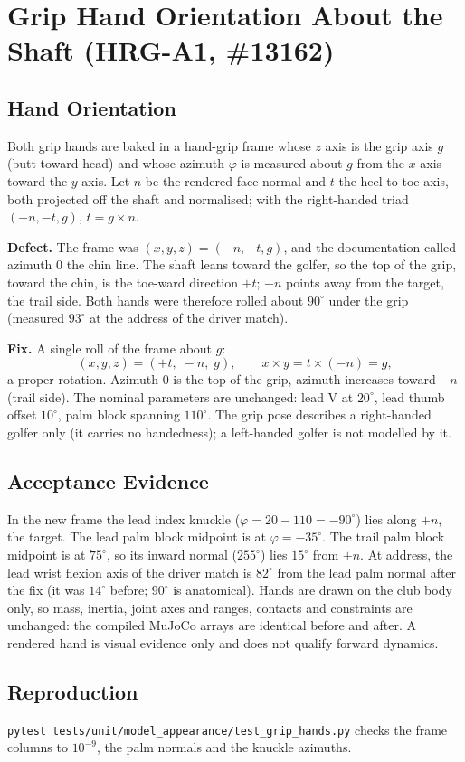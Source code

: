 \section{Grip Hand Orientation About the Shaft (HRG-A1, \#13162)}

\subsection{Hand Orientation}
Both grip hands are baked in a hand-grip frame whose $z$ axis is the grip axis
$g$ (butt toward head) and whose azimuth $\varphi$ is measured about $g$ from
the $x$ axis toward the $y$ axis. Let $n$ be the rendered face normal and $t$
the heel-to-toe axis, both projected off the shaft and normalised; with the
right-handed triad $(-n, -t, g)$, $t = g \times n$.

\textbf{Defect.} The frame was $(x, y, z) = (-n, -t, g)$, and the documentation
called azimuth 0 the chin line. The shaft leans toward the golfer, so the top of
the grip, toward the chin, is the toe-ward direction $+t$; $-n$ points away from
the target, the trail side. Both hands were therefore rolled about $90^{\circ}$
under the grip (measured $93^{\circ}$ at the address of the driver match).

\textbf{Fix.} A single roll of the frame about $g$:
\begin{equation}
  (x, y, z) = (+t,\; -n,\; g), \qquad x \times y = t \times (-n) = g,
\end{equation}
a proper rotation. Azimuth 0 is the top of the grip, azimuth increases toward
$-n$ (trail side). The nominal parameters are unchanged: lead V at
$20^{\circ}$, lead thumb offset $10^{\circ}$, palm block spanning $110^{\circ}$.
The grip pose describes a right-handed golfer only (it carries no handedness);
a left-handed golfer is not modelled by it.

\subsection{Acceptance Evidence}
In the new frame the lead index knuckle ($\varphi = 20 - 110 = -90^{\circ}$)
lies along $+n$, the target. The lead palm block midpoint is at
$\varphi = -35^{\circ}$. The trail palm block midpoint is at $75^{\circ}$, so its
inward normal ($255^{\circ}$) lies $15^{\circ}$ from $+n$. At address, the lead
wrist flexion axis of the driver match is $82^{\circ}$ from the lead palm
normal after the fix (it was $14^{\circ}$ before; $90^{\circ}$ is anatomical).
Hands are drawn on the club body only, so mass, inertia, joint axes and ranges,
contacts and constraints are unchanged: the compiled MuJoCo arrays are identical
before and after. A rendered hand is visual evidence only and does not qualify
forward dynamics.

\subsection{Reproduction}
\texttt{pytest tests/unit/model\_appearance/test\_grip\_hands.py} checks the frame
columns to $10^{-9}$, the palm normals and the knuckle azimuths.
